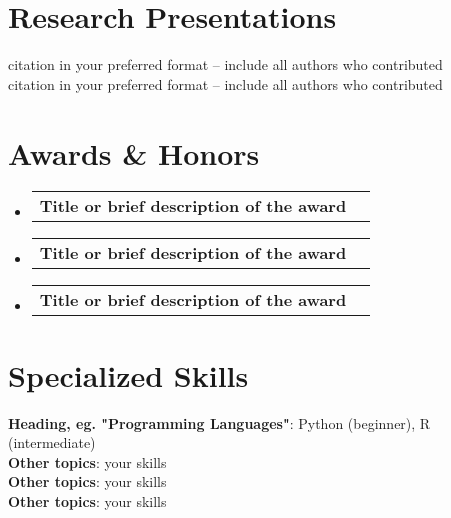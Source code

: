 \documentclass[letterpaper,11pt]{article}
\makeatletter
\newcommand{\resumeSubheading}[4]{
  \vspace{-5pt}\item
    \begin{tabular*}{0.97\textwidth}[t]{l@{\extracolsep{\fill}}r}
      \textbf{#1} & #2 \\
    \end{tabular*}\vspace{-10pt}
}
\newcommand{\resumeSubHeadingListStart}{\vspace{1pt}\begin{itemize}[leftmargin=0.15in, label={}]}
\newcommand{\resumeSubHeadingListEnd}{\end{itemize}}
\makeatother
\begin{document}


\section{Research Presentations} 
\begin{itemize}[leftmargin=0.15in, label={}]
    \normalsize{\item{
    {citation in your preferred format -- include all authors who contributed}{} \\
    {citation in your preferred format -- include all authors who contributed}{} 
}}
 \end{itemize}

\section{Awards \& Honors} 
\resumeSubHeadingListStart
    \resumeSubheading
    {Title or brief description of the award}{}
    {University, Sponsor or Organization}{year(s)}
    \resumeSubheading
    {Title or brief description of the award}{}
    {University, Sponsor or Organization}{year(s)}
    \resumeSubheading
    {Title or brief description of the award}{}
    {University, Sponsor or Organization}{year(s)}
\resumeSubHeadingListEnd

\section{Specialized Skills}
\begin{itemize}[leftmargin=0.15in, label={}]
    \normalsize{\item{
     \textbf{Heading, eg. "Programming Languages"}{: Python (beginner), R (intermediate)} \\
     \textbf{Other topics}{: your skills}\\
     \textbf{Other topics}{: your skills} \\
     \textbf{Other topics}{: your skills} \\
    }}
 \end{itemize}
\end{document}
